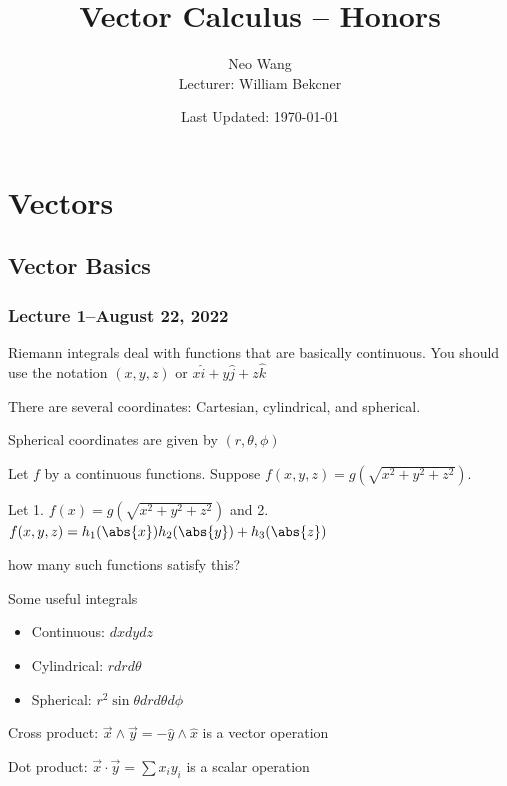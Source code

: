 \documentclass{scrreprt}
\title{Vector Calculus -- Honors}
\author{Neo Wang\\ Lecturer: William Bekcner}
\date{Last Updated: \today}
\begin{document}
\maketitle


\chapter{Vectors}

\section{Vector Basics}

\subsection{Lecture 1--August 22, 2022}

Riemann integrals deal with functions that are basically continuous.
You should use the notation $(x, y, z)$ or $x\hat{i} + y\hat{j} + z\hat{k}$

There are several coordinates: Cartesian, cylindrical, and spherical.

Spherical coordinates are given by $(r, \theta, \phi)$

\begin{example}
	Let $f$ by a continuous functions. Suppose $f(x,y,z)=g(\sqrt{x^2+y^2+z^2})$.

	Let 1. $f(x)=g(\sqrt{x^2+y^2+z^2})$
	and 2. $f(x, y, z) = h_1(\abs{x})h_2(\abs{y})+h_3(\abs{z})$

	how many such functions satisfy this?
\end{example}

\begin{definition}
	Some useful integrals
	\begin{itemize}
		\item Continuous: $dxdydz$
		\item Cylindrical: $rdrd\theta$
		\item Spherical: $r^2\sin\theta drd\theta d\phi$
	\end{itemize}
\end{definition}

\begin{definition}[Vectors]
	Cross product: $\vec{x}\wedge \vec{y} = -\hat{y} \wedge \hat{x}$ is a vector operation

	Dot product: $\vec{x}\cdot \vec{y} = \sum x_i y_i$ is a scalar operation
\end{definition}
\end{document}
